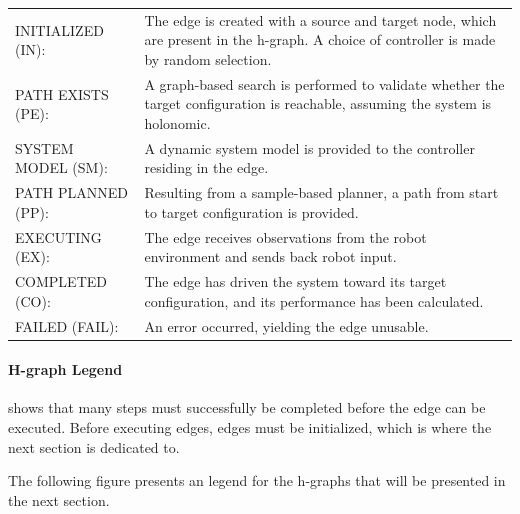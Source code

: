 \noindent
\begin{table}[H]
\centering
\begin{tabular}%
  {>{\raggedleft\arraybackslash}p{}%
   >{\raggedright\arraybackslash}p{}}
INITIALIZED (IN): & The edge is created with a source and target node, which are present in the \ac{h-graph}. A choice of controller is made by random selection. \\
PATH EXISTS (PE): & A graph-based search is performed to validate whether the target configuration is reachable, assuming the system is holonomic. \\
SYSTEM MODEL (SM): & A dynamic system model is provided to the controller residing in the edge. \\
PATH PLANNED (PP): & Resulting from a sample-based planner, a path from start to target configuration is provided. \\
EXECUTING (EX): & The edge receives observations from the robot environment and sends back robot input. \\
COMPLETED (CO): & The edge has driven the system toward its target configuration, and its performance has been calculated. \\
FAILED (FAIL): & An error occurred, yielding the edge unusable. \\
\end{tabular}
\end{table}


\paragraph{\ac{H-graph} Legend}
 shows that many steps must successfully be completed before the edge can be executed.
Before executing edges, edges must be initialized, which is where the next section is dedicated to.\bs

The following figure presents an legend for the \ac{h-graph}s that will be presented in the next section.\bs

